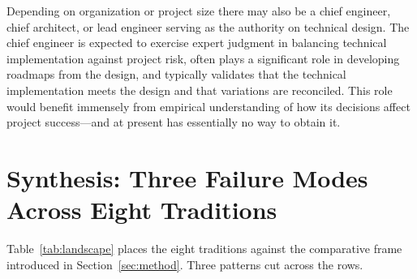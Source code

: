 \documentclass[11pt,a4paper]{article}
\begin{document}
Depending on organization or project size there may also be a chief engineer,
chief architect, or lead engineer serving as the authority on technical design.
The chief engineer is expected to exercise expert judgment in balancing
technical implementation against project risk, often plays a significant role in
developing roadmaps from the design, and typically validates that the technical
implementation meets the design and that variations are reconciled. This role
would benefit immensely from empirical understanding of how its decisions affect
project success---and at present has essentially no way to obtain it.

\section{Synthesis: Three Failure Modes Across Eight Traditions}
\label{sec:synthesis}

Table~\ref{tab:landscape} places the eight traditions against the comparative
frame introduced in Section~\ref{sec:method}. Three patterns cut across the rows.
\end{document}
